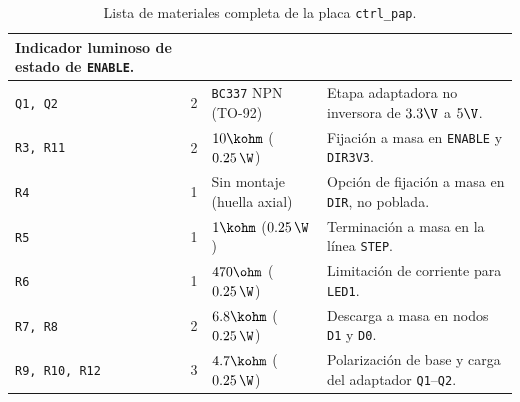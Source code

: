 \begin{table}[!ht]
{\begin{tabular}{|l|c|l|p{6.5cm}|}
        Indicador luminoso de estado de \texttt{ENABLE}. \\ \hline
      \texttt{Q1, Q2} & 2 & \texttt{BC337} NPN (TO-92) & Etapa adaptadora no inversora de $3.3\V$ a $5\V$. \\ \hline
      \texttt{R3, R11} & 2 & $10\kohm$ ($0.25\,\W$) & Fijación a masa en \texttt{ENABLE} y \texttt{DIR3V3}. \\ \hline
      \texttt{R4} & 1 & Sin montaje (huella axial) & Opción de fijación a masa en \texttt{DIR}, no poblada. \\ \hline
      \texttt{R5} & 1 & $1\kohm$ ($0.25\,\W$) & Terminación a masa en la línea \texttt{STEP}. \\ \hline
      \texttt{R6} & 1 & $470\ohm$ ($0.25\,\W$) & Limitación de corriente para \texttt{LED1}. \\ \hline
      \texttt{R7, R8} & 2 & $6.8\kohm$ ($0.25\,\W$) & Descarga a masa en nodos \texttt{D1} y \texttt{D0}. \\ \hline
      \texttt{R9, R10, R12} & 3 & $4.7\kohm$ ($0.25\,\W$) &
        Polarización de base y carga del adaptador \texttt{Q1}--\texttt{Q2}. \\ \hline
    \end{tabular}
  }
  \caption{Lista de materiales completa de la placa \texttt{ctrl\_pap}.}
  \label{tab.ej4:bom}
\end{table}
